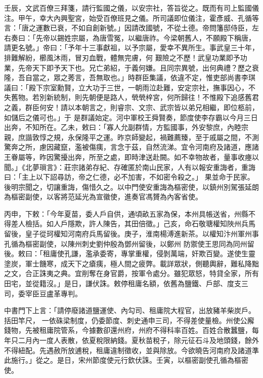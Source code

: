 \begin{pinyinscope}
 壬辰，文武百僚三拜箋，請行監國之儀，以安宗社，答旨從之。既而有司上監國儀注。甲午，幸大內興聖宮，始受百僚班見之儀。所司議即位儀注，霍彥威、孔循等言：「唐之運數已衰，不如自創新號。」因請改國號，不從土德。帝問籓邸侍臣，左右奏曰：「先帝以錫姓宗屬，為唐雪冤，以繼唐祚。今梁朝舊人，不願殿下稱唐，請更名號。」帝曰：「予年十三事獻祖，以予宗屬，愛幸不異所生。事武皇三十年，排難解紛，櫛風沐雨，冒刃血戰，體無完膚，何
 艱險之不歷！武皇功業即予功業，先帝天下即予天下也。兄亡弟紹，于義何嫌。且同宗異號，出何典禮？歷之衰隆，吾自當之，眾之莠言，吾無取也。」時群臣集議，依違不定，惟吏部尚書李琪議曰：「殿下宗室勳賢，立大功于三世，一朝雨泣赴難，安定宗社，撫事因心，不失舊物。若別新統制，則先朝便是路人，煢煢梓宮，何所歸往！不惟殿下追感舊君之義，群臣何安！請以本朝言之，則睿宗、文宗、武宗皆以弟兄相繼，即位柩前，如儲后之儀可也。」于
 是群議始定。河中軍校王舜賢奏，節度使李存霸以今月三日出奔，不知所在。乙未，敕曰：「寡人允副群情，方監國事，外安黎庶，內睦宗親，庶諧敦惇之規，永保隆平之運。昨京師變起，禍難薦臻，至于戚屬之間，不測驚奔之所，慮因藏竄，濫被傷痍，言念于茲，自然流涕。宜令河南府及諸道，應諸王眷屬等，昨因驚擾出奔，所至之處，即時津送赴闕。如不幸物故者，量事收瘞以聞。」《北夢瑣言》：莊宗諸弟存紀、存確匿於南山民家，人有以報安重誨者，重誨曰：「主上以下詔尋訪，帝之仁德，必不加害，不如密令殺之。」
 果並命于民家。後明宗聞之，切讓重誨，傷惜久之。以中門使安重誨為樞密使，以鎮州別駕張延朗為樞密副使，以客將范延光為宣徽使，進奏官馮贇為內客省使。



 丙申，下敕：「今年夏苗，委人戶自供，通頃畝五家為保，本州具帳送省，州縣不得差人檢括。如人戶隱欺，許人陳告，其田倍徵。」己亥，命石敬瑭權知陜州兵馬留後，皇子從珂權知河南府兵馬留後。庚子，淮南楊溥進新茶。以權知汴州軍州事孔循為樞密副使，以陳州刺史劉仲殷為鄧州留後，以鄭州
 防禦使王思同為同州留後。敕曰：「租庸使孔謙，濫承委寄，專掌重權，侵剝萬端，奸欺百變。遂使生靈塗炭，軍士饑寒，成天下之瘡痍，極人間之疲弊。載詳眾狀，側聽輿辭，難私降黜之文，合正誅夷之典。宜削奪在身官爵，按軍令處分。雖犯眾怒，特貸全家，所有田宅，並從籍沒。」是日，謙伏誅。敕停租庸名額，依舊為鹽鐵、戶部、度支三司，委宰臣豆盧革專判。



 中書門下上言：「請停廢諸道鹽運使、內勾司、租庸院大程官，出放豬羊柴炭戶。括田竿尺，
 一依硃梁制度，仍委節度、刺史通申三司，不得差使量檢。州使公廨錢物，先被租庸院管系，今據數卻還州府，州府不得科率百姓。百姓合散蠶鹽，每年只二月內一度人表散，依夏稅限納錢。夏秋苗稅子，除元征石斗及地頭錢，餘外不得紐配。先遇赦所放逋稅，租庸違制徵收，並與除放。今欲曉告河南府及諸道準此施行。」從之。是日，宋州節度使元行欽伏誅。壬寅，以樞密副使孔循為樞密使。



\end{pinyinscope}